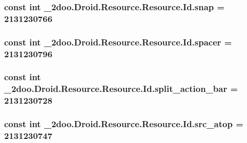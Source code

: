 \hypertarget{class__2doo_1_1_droid_1_1_resource_1_1_id_1ad45a730ff718de6304b52e87229820}{
\subsubsection[{snap}]{\setlength{\rightskip}{0pt plus 5cm}const int \_\-2doo.Droid.Resource.Resource.Id.snap = 2131230766}}
\label{class__2doo_1_1_droid_1_1_resource_1_1_id_1ad45a730ff718de6304b52e87229820}


\hypertarget{class__2doo_1_1_droid_1_1_resource_1_1_id_b4aa993a7918b53e18a51bfe3a749fa2}{
\subsubsection[{spacer}]{\setlength{\rightskip}{0pt plus 5cm}const int \_\-2doo.Droid.Resource.Resource.Id.spacer = 2131230796}}
\label{class__2doo_1_1_droid_1_1_resource_1_1_id_b4aa993a7918b53e18a51bfe3a749fa2}


\hypertarget{class__2doo_1_1_droid_1_1_resource_1_1_id_71290cbe138eca425ff897eee2097263}{
\subsubsection[{split\_\-action\_\-bar}]{\setlength{\rightskip}{0pt plus 5cm}const int \_\-2doo.Droid.Resource.Resource.Id.split\_\-action\_\-bar = 2131230728}}
\label{class__2doo_1_1_droid_1_1_resource_1_1_id_71290cbe138eca425ff897eee2097263}


\hypertarget{class__2doo_1_1_droid_1_1_resource_1_1_id_9232aa18efff43d491fb15961f954844}{
\subsubsection[{src\_\-atop}]{\setlength{\rightskip}{0pt plus 5cm}const int \_\-2doo.Droid.Resource.Resource.Id.src\_\-atop = 2131230747}}
\label{class__2doo_1_1_droid_1_1_resource_1_1_id_9232aa18efff43d491fb15961f954844}


